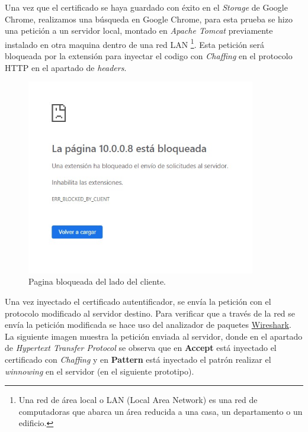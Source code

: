 \documentclass[12pt, a4paper, titlepage]{report}
\begin{document}
        	Una vez que el certificado se haya guardado con éxito en el \textit{Storage} de Google Chrome, realizamos una búsqueda en Google Chrome, para esta prueba se hizo una petición a un servidor local, montado en \textit{Apache Tomcat} previamente instalado en otra maquina dentro de una red LAN \footnote{Una red de área local o LAN (Local Area Network) es una red de computadoras que abarca un área reducida a una casa, un departamento o un edificio.}. Esta petición será bloqueada por la extensión para inyectar el codigo con \textit{Chaffing} en el protocolo HTTP en el apartado de \textit{headers}.
	
            \begin{figure}[H]
        		\begin{center}	\includegraphics[width=10cm]{./imagenes/Pruebas/Prototipo_2/pageBlocked.jpeg}
        			\caption{Pagina bloqueada del lado del cliente.}
        		\end{center}
        	\end{figure}
    
            Una vez inyectado el certificado autentificador, se envía la petición con el protocolo modificado al servidor destino. Para verificar que a través de la red se envía la petición modificada se hace uso del analizador de paquetes \hyperref[WiresharkDefinition]{Wireshark}.\\ La siguiente imagen muestra la petición enviada al servidor, donde en el apartado de \textit{Hypertext Transfer Protocol} se observa que en \textbf{Accept} está inyectado el certificado con \textit{Chaffing} y en \textbf{Pattern} está inyectado el patrón realizar el \textit{winnowing} en el servidor (en el siguiente prototipo).
    
\end{document}
